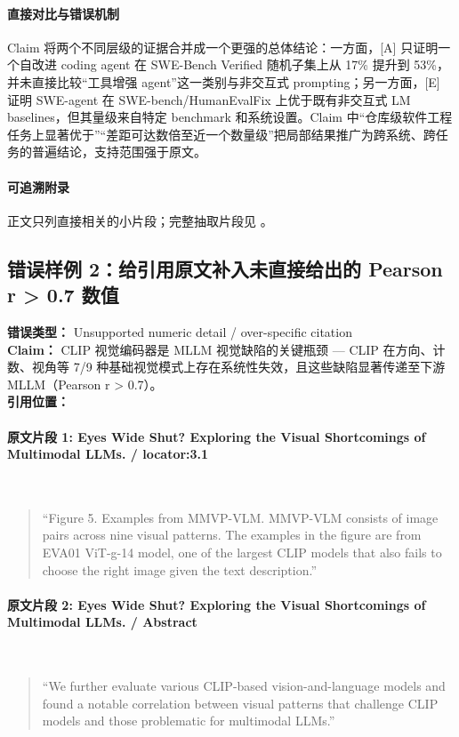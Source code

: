 \documentclass[10pt]{ctexart}
\begin{document}
\paragraph{直接对比与错误机制} Claim 将两个不同层级的证据合并成一个更强的总体结论：一方面，[A] 只证明一个自改进 coding agent 在 SWE-Bench Verified 随机子集上从 17\% 提升到 53\%，并未直接比较“工具增强 agent”这一类别与非交互式 prompting；另一方面，[E] 证明 SWE-agent 在 SWE-bench/HumanEvalFix 上优于既有非交互式 LM baselines，但其量级来自特定 benchmark 和系统设置。Claim 中“仓库级软件工程任务上显著优于”“差距可达数倍至近一个数量级”把局部结果推广为跨系统、跨任务的普遍结论，支持范围强于原文。
\paragraph{可追溯附录} 正文只列直接相关的小片段；完整抽取片段见 。
\subsection{错误样例 2：给引用原文补入未直接给出的 Pearson r > 0.7 数值}
\textbf{错误类型：} Unsupported numeric detail / over-specific citation\\
\textbf{Claim：} CLIP 视觉编码器是 MLLM 视觉缺陷的关键瓶颈 — CLIP 在方向、计数、视角等 7/9 种基础视觉模式上存在系统性失效，且这些缺陷显著传递至下游 MLLM（Pearson r > 0.7）。\\
\textbf{引用位置：} 
\paragraph{原文片段 1: Eyes Wide Shut? Exploring the Visual Shortcomings of Multimodal LLMs. / locator:3.1}\mbox{}\\
\begin{quote}\small
“Figure 5. Examples from MMVP-VLM. MMVP-VLM consists of image pairs across nine visual patterns. The examples in the figure are from EVA01 ViT-g-14 model, one of the largest CLIP models that also fails to choose the right image given the text description.”
\end{quote}
\paragraph{原文片段 2: Eyes Wide Shut? Exploring the Visual Shortcomings of Multimodal LLMs. / Abstract}\mbox{}\\
\begin{quote}\small
“We further evaluate various CLIP-based vision-and-language models and found a notable correlation between visual patterns that challenge CLIP models and those problematic for multimodal LLMs.”
\end{quote}
\end{document}

